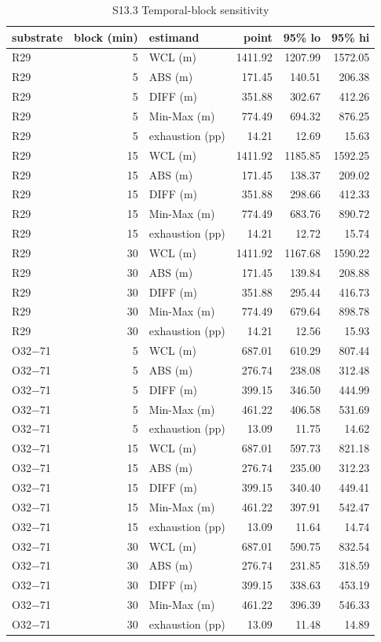 \documentclass[journal,onecolumn,10pt]{IEEEtran}
\begin{document}
\begin{longtable}[]{@{}lrlrrr@{}}
\caption{S13.3 Temporal-block sensitivity}\\
\toprule
substrate & block (min) & estimand & point & 95\% lo & 95\% hi \\
\midrule
\endhead
\bottomrule
\endlastfoot
R29 & 5 & WCL (m) & 1411.92 & 1207.99 & 1572.05 \\
R29 & 5 & ABS (m) & 171.45 & 140.51 & 206.38 \\
R29 & 5 & DIFF (m) & 351.88 & 302.67 & 412.26 \\
R29 & 5 & Min-Max (m) & 774.49 & 694.32 & 876.25 \\
R29 & 5 & exhaustion (pp) & 14.21 & 12.69 & 15.63 \\
R29 & 15 & WCL (m) & 1411.92 & 1185.85 & 1592.25 \\
R29 & 15 & ABS (m) & 171.45 & 138.37 & 209.02 \\
R29 & 15 & DIFF (m) & 351.88 & 298.66 & 412.33 \\
R29 & 15 & Min-Max (m) & 774.49 & 683.76 & 890.72 \\
R29 & 15 & exhaustion (pp) & 14.21 & 12.72 & 15.74 \\
R29 & 30 & WCL (m) & 1411.92 & 1167.68 & 1590.22 \\
R29 & 30 & ABS (m) & 171.45 & 139.84 & 208.88 \\
R29 & 30 & DIFF (m) & 351.88 & 295.44 & 416.73 \\
R29 & 30 & Min-Max (m) & 774.49 & 679.64 & 898.78 \\
R29 & 30 & exhaustion (pp) & 14.21 & 12.56 & 15.93 \\
O32$-$71 & 5 & WCL (m) & 687.01 & 610.29 & 807.44 \\
O32$-$71 & 5 & ABS (m) & 276.74 & 238.08 & 312.48 \\
O32$-$71 & 5 & DIFF (m) & 399.15 & 346.50 & 444.99 \\
O32$-$71 & 5 & Min-Max (m) & 461.22 & 406.58 & 531.69 \\
O32$-$71 & 5 & exhaustion (pp) & 13.09 & 11.75 & 14.62 \\
O32$-$71 & 15 & WCL (m) & 687.01 & 597.73 & 821.18 \\
O32$-$71 & 15 & ABS (m) & 276.74 & 235.00 & 312.23 \\
O32$-$71 & 15 & DIFF (m) & 399.15 & 340.40 & 449.41 \\
O32$-$71 & 15 & Min-Max (m) & 461.22 & 397.91 & 542.47 \\
O32$-$71 & 15 & exhaustion (pp) & 13.09 & 11.64 & 14.74 \\
O32$-$71 & 30 & WCL (m) & 687.01 & 590.75 & 832.54 \\
O32$-$71 & 30 & ABS (m) & 276.74 & 231.85 & 318.59 \\
O32$-$71 & 30 & DIFF (m) & 399.15 & 338.63 & 453.19 \\
O32$-$71 & 30 & Min-Max (m) & 461.22 & 396.39 & 546.33 \\
O32$-$71 & 30 & exhaustion (pp) & 13.09 & 11.48 & 14.89 \\
\end{longtable}
\end{document}
